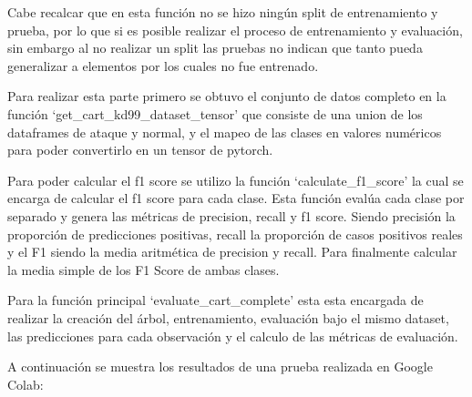 \documentclass[12pt,a4paper]{article}
\begin{document}
Cabe recalcar que en esta función no se hizo ningún split de entrenamiento y prueba, por lo que si es posible realizar el proceso
de entrenamiento y evaluación, sin embargo al no realizar un split las pruebas no indican que tanto pueda generalizar a elementos
por los cuales no fue entrenado.

Para realizar esta parte primero se obtuvo el conjunto de datos completo en la función `get_cart_kd99_dataset_tensor'
que consiste de una union de los dataframes de ataque y normal, y
el mapeo de las clases en valores numéricos para poder convertirlo en un tensor de pytorch.

Para poder calcular el f1 score se utilizo la función `calculate_f1_score' la cual se encarga de calcular
el f1 score para cada clase.
Esta función evalúa cada clase por separado y genera las métricas de precision, recall y f1 score.
Siendo precisión la proporción de predicciones positivas, recall la proporción de casos positivos reales y el F1 siendo la media aritmética de precision y recall.
Para finalmente calcular la media simple de los F1 Score de ambas clases.

Para la función principal `evaluate_cart_complete' esta esta encargada de realizar la creación del árbol, entrenamiento, evaluación
bajo el mismo dataset, las predicciones para cada observación y el calculo de las métricas de evaluación.

A continuación se muestra los resultados de una prueba realizada en Google Colab:
\end{document}
